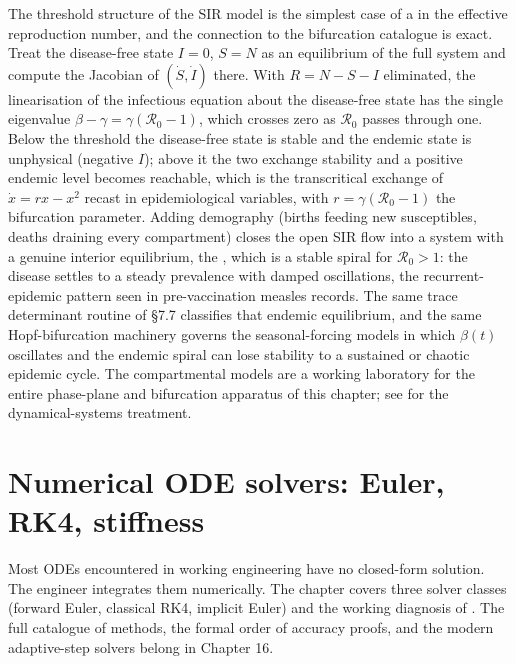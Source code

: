 \begin{mastery}
The threshold structure of the SIR model is the simplest case of a
 in the effective reproduction
number, and the connection to the bifurcation catalogue is exact. Treat
the disease-free state $I = 0$, $S = N$ as an equilibrium of the full
system and compute the Jacobian of $(\dot{S}, \dot{I})$ there. With
$R = N - S - I$ eliminated, the linearisation of the infectious
equation about the disease-free state has the single eigenvalue
$\beta - \gamma = \gamma(\mathcal{R}_{0} - 1)$, which crosses zero as
$\mathcal{R}_{0}$ passes through one. Below the threshold the
disease-free state is stable and the endemic state is unphysical
(negative $I$); above it the two exchange stability and a positive
endemic level becomes reachable, which is the transcritical exchange of
$\dot{x} = rx - x^{2}$ recast in epidemiological variables, with $r =
\gamma(\mathcal{R}_{0} - 1)$ the bifurcation parameter. Adding
demography (births feeding new susceptibles, deaths draining every
compartment) closes the open SIR flow into a system with a genuine
interior equilibrium, the , which is a
stable spiral for $\mathcal{R}_{0} > 1$: the disease settles to a
steady prevalence with damped oscillations, the recurrent-epidemic
pattern seen in pre-vaccination measles records. The same trace
determinant routine of \S7.7 classifies that endemic equilibrium, and
the same Hopf-bifurcation machinery governs the seasonal-forcing models
in which $\beta(t)$ oscillates and the endemic spiral can lose
stability to a sustained or chaotic epidemic cycle. The compartmental
models are a working laboratory for the entire phase-plane and
bifurcation apparatus of this chapter; see
\textcite{text:v2ch07-strogatz-nonlinear} for the dynamical-systems
treatment.
\end{mastery}

\section{Numerical ODE solvers: Euler, RK4, stiffness}

Most ODEs encountered in working engineering have no closed-form
solution. The engineer integrates them numerically. The chapter
covers three solver classes (forward Euler, classical RK4, implicit
Euler) and the working diagnosis of . The full
catalogue of methods, the formal order of accuracy proofs, and the
modern adaptive-step solvers belong in Chapter 16.

